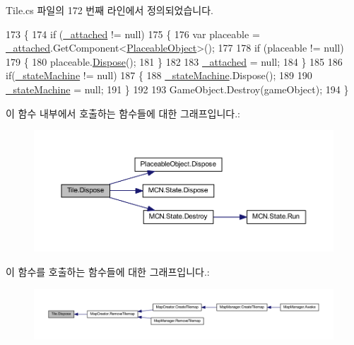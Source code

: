 Tile.\+cs 파일의 172 번째 라인에서 정의되었습니다.


\begin{DoxyCode}
173     \{
174         \textcolor{keywordflow}{if} (\hyperlink{class_tile_aa548ae60732f4d054b6777436baefdd5}{\_attached} != null)
175         \{
176             var placeable = \hyperlink{class_tile_aa548ae60732f4d054b6777436baefdd5}{\_attached}.GetComponent<\hyperlink{class_placeable_object}{PlaceableObject}>();
177 
178             \textcolor{keywordflow}{if} (placeable != null)
179             \{
180                 placeable.\hyperlink{class_placeable_object_a8bd49b7db556556502a0518fc833be48}{Dispose}();
181             \}
182 
183             \hyperlink{class_tile_aa548ae60732f4d054b6777436baefdd5}{\_attached} = null;
184         \}
185 
186         \textcolor{keywordflow}{if}(\hyperlink{class_tile_a822a1bffe56b1193b8c5c61070ea7827}{\_stateMachine} != null)
187         \{
188             \hyperlink{class_tile_a822a1bffe56b1193b8c5c61070ea7827}{\_stateMachine}.Dispose();
189 
190             \hyperlink{class_tile_a822a1bffe56b1193b8c5c61070ea7827}{\_stateMachine} = null;
191         \}
192 
193         GameObject.Destroy(gameObject);
194     \}
\end{DoxyCode}


이 함수 내부에서 호출하는 함수들에 대한 그래프입니다.\+:\nopagebreak
\begin{figure}[H]
\begin{center}
\leavevmode
\includegraphics[width=350pt]{class_tile_a6e8a801e95a29156cbf32024e45c6596_cgraph}
\end{center}
\end{figure}




이 함수를 호출하는 함수들에 대한 그래프입니다.\+:\nopagebreak
\begin{figure}[H]
\begin{center}
\leavevmode
\includegraphics[width=350pt]{class_tile_a6e8a801e95a29156cbf32024e45c6596_icgraph}
\end{center}
\end{figure}


